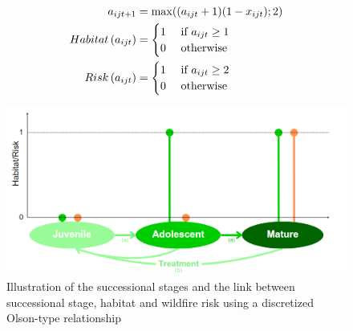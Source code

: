    \begin{align}
a_{ijt+1} &= \max \large((a_{ijt} + 1)(1-x_{ijt}); 2 \large)
\label{eq:fuel_dyn}\\
Habitat\left(a_{ijt}\right) &= \begin{cases}
        1 &\text{ if } a_{ijt} \geq 1\\
        0 &\text{ otherwise }
    \end{cases}
\label{eq:mature}\\
Risk\left(a_{ijt}\right) &= \begin{cases}
1 &\text{ if }a_{ijt}\geq 2\\
0 &\text{ otherwise}
    \end{cases}
\label{eq:high_fuel}
\end{align}
\hfill
\begin{figure}
    \centering
    \includegraphics[width = .8\textwidth]{figures/wildland/Juvenile.png}
    \caption{Illustration of the successional stages and the link between successional stage, habitat and wildfire risk using a discretized Olson-type relationship}
    \label{fig:illustration}
\end{figure}




